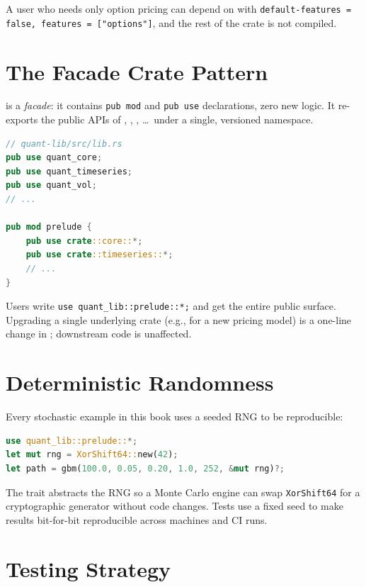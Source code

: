 A user who needs only option pricing can depend on
 with \texttt{default-features = false, features =
["options"]}, and the rest of the crate is not compiled.

\section{The Facade Crate Pattern}

 is a \emph{facade}: it contains \texttt{pub mod}
and \texttt{pub use} declarations, zero new logic. It re-exports the
public APIs of , ,
, \dots\ under a single, versioned namespace.

\begin{lstlisting}[language=Rust]
// quant-lib/src/lib.rs
pub use quant_core;
pub use quant_timeseries;
pub use quant_vol;
// ...

pub mod prelude {
    pub use crate::core::*;
    pub use crate::timeseries::*;
    // ...
}
\end{lstlisting}

Users write \texttt{use quant\_lib::prelude::*;} and get the entire
public surface. Upgrading a single underlying crate (e.g.,
 for a new pricing model) is a one-line change
in ; downstream code is unaffected.

\section{Deterministic Randomness}

Every stochastic example in this book uses a seeded RNG to be
reproducible:

\begin{lstlisting}[language=Rust]
use quant_lib::prelude::*;
let mut rng = XorShift64::new(42);
let path = gbm(100.0, 0.05, 0.20, 1.0, 252, &mut rng)?;
\end{lstlisting}

The  trait abstracts the RNG so a Monte Carlo engine can
swap \texttt{XorShift64} for a cryptographic generator without code
changes. Tests use a fixed seed to make results bit-for-bit
reproducible across machines and CI runs.

\section{Testing Strategy}


